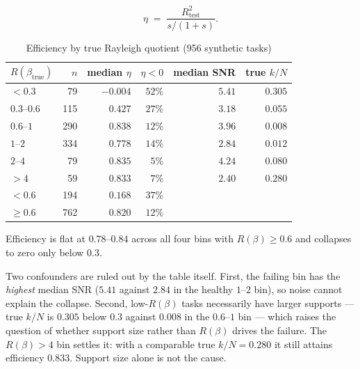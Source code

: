 \documentclass[11pt]{article}
\newcommand{\Rq}{R(\beta)}
\newcommand{\Rtrue}{R(\beta_{\mathrm{true}})}
\begin{document}
\begin{equation}
\eta \;=\; \frac{R^2_{\text{test}}}{s/(1+s)} .
\end{equation}

\begin{table}[h]
\centering
\caption{Efficiency by true Rayleigh quotient (956 synthetic tasks)}
\begin{tabular}{@{}lrrrrr@{}}
\toprule
$\Rtrue$ & $n$ & median $\eta$ & $\eta < 0$ & median SNR & true $k/N$ \\
\midrule
$< 0.3$        &  79 & $-0.004$ & $52\%$ & $5.41$ & $0.305$ \\
$0.3$--$0.6$   & 115 & $\phantom{-}0.427$ & $27\%$ & $3.18$ & $0.055$ \\
$0.6$--$1$     & 290 & $\phantom{-}0.838$ & $12\%$ & $3.96$ & $0.008$ \\
$1$--$2$       & 334 & $\phantom{-}0.778$ & $14\%$ & $2.84$ & $0.012$ \\
$2$--$4$       &  79 & $\phantom{-}0.835$ & $\phantom{0}5\%$ & $4.24$ & $0.080$ \\
$> 4$          &  59 & $\phantom{-}0.833$ & $\phantom{0}7\%$ & $2.40$ & $0.280$ \\
\midrule
$< 0.6$        & 194 & $\phantom{-}0.168$ & $37\%$ & & \\
$\ge 0.6$      & 762 & $\phantom{-}0.820$ & $12\%$ & & \\
\bottomrule
\end{tabular}
\end{table}

Efficiency is flat at $0.78$--$0.84$ across all four bins with
$\Rq \ge 0.6$ and collapses to zero only below $0.3$.

Two confounders are ruled out by the table itself.
First, the failing bin has the \emph{highest} median SNR ($5.41$ against
$2.84$ in the healthy $1$--$2$ bin), so noise cannot explain the collapse.
Second, low-$\Rq$ tasks necessarily have larger supports --- true $k/N$ is
$0.305$ below $0.3$ against $0.008$ in the $0.6$--$1$ bin --- which raises
the question of whether support size rather than $\Rq$ drives the failure.
The $\Rq > 4$ bin settles it: with a comparable true $k/N = 0.280$ it still
attains efficiency $0.833$. Support size alone is not the cause.
\end{document}
